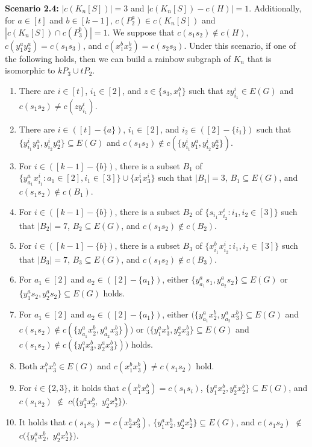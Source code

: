 \documentclass[12pt]{article}
\begin{document}
{\bf Scenario 2.4:} \(|c(K_n[S])|=3\) and \(|c(K_n[S]) - c(H)|=1\). Additionally, for \(a\in[t]\) and \(b\in[k-1]\), \(c(P_2^a) \in c(K_n[S])\) and \(|c(K_n[S]) \cap c(P_3^b)|=1\). We suppose that \(c(s_1s_2) \notin c(H)\), \(c(y_1^a y_2^a) = c(s_1s_3)\), and \(c(x_1^b x_2^b) = c(s_2s_3)\). Under this scenario, if one of the following holds, then we can build a rainbow subgraph of \(K_n\) that is isomorphic to \(kP_3 \cup tP_2\).
\begin{enumerate}
 \item There are $i\in[t]$, $i_1\in[2]$, and $z\in\{s_3,x^b_1\}$ such that $z y^i_{i_1} \in E(G)$ and $c(s_1s_2)\neq c(z y^i_{i_1})$.
 \item There are $i\in([t]-\{a\})$, $i_1\in[2]$, and $i_2\in([2]-\{i_1\})$ such that $\{y^i_{i_1}y^a_1,y^i_{i_2}y^a_2\}\subseteq E(G)$ and $c(s_1s_2)\not\in c(\{y^i_{i_1}y^a_1,y^i_{i_2}y^a_2\})$.
 \item For  $i\in ([k-1]-\{b\})$, there is a subset $B_1$ of $\{y^a_{a_1}x^i_{i_1}:a_1\in[2],i_1\in[3]\}\cup\{x^i_1x^i_3\}$ such that $|B_1|=3$, $B_1\subseteq E(G)$, and $c(s_1s_2)\notin c(B_1)$.
 \item For $i\in ([k-1]-\{b\})$, there is a subset $B_2$ of $\{s_{i_1}x^i_{i_2}:i_1,i_2\in[3]\}$ such that $|B_2|=7$, $B_2\subseteq E(G)$, and $c(s_1s_2)\notin c(B_2)$.
 \item For $i\in ([k-1]-\{b\})$, there is a subset $B_3$ of $\{x^b_{i_1}x^i_{i_2}:i_1,i_2\in[3]\}$ such that $|B_3|=7$, $B_3\subseteq E(G)$, and $c(s_1s_2)\notin c(B_3)$.
\item For $a_1\in[2]$ and $a_2\in([2]-\{a_1\})$, either $\{y^a_{a_1}s_1,y^a_{a_2}s_2\}\subseteq E(G)$ or $\{y^a_{1}s_2,y^a_{2}s_2\}\subseteq E(G)$ holds.
\item For $a_1\in[2]$ and $a_2\in([2]-\{a_1\})$, either $\big(\{y^a_{a_1}x^b_2,y^a_{a_2}x^b_3\}\subseteq E(G)$ and $c(s_1s_2)\notin c(\{y^a_{a_1}x^b_2,y^a_{a_2}x^b_3\})\big)$ or $\big(\{y^a_{1}x^b_3,y^a_{2}x^b_3\}\subseteq E(G)$ and $c(s_1s_2)\notin c(\{y^a_{1}x^b_3,y^a_{2}x^b_3\})\big)$ holds.
\item Both \( x_1^bx_3^b\in E(G) \) and $c(x_1^bx_3^b)\neq c(s_1s_2)$ hold.
\item For $i\in\{2,3\}$, it holds that $c(x^b_1x^b_3)=c(s_1s_i)$, $\{y^a_{1}x^b_2,y^a_{2}x^b_2\}\subseteq E(G)$, and $c(s_1s_2)$ $\notin$ $c(\{y^a_{1}x^b_2,$ $y^a_{2}x^b_2\})$.
\item It holds that $c(s_1s_3)=c(x^b_2x^b_3)$, $\{y^a_{1}x^b_2,y^a_{2}x^b_2\}\subseteq E(G)$, and $c(s_1s_2)$ $\notin$ $c(\{y^a_{1}x^b_2,$ $y^a_{2}x^b_2\})$.

\end{enumerate}
\end{document}
